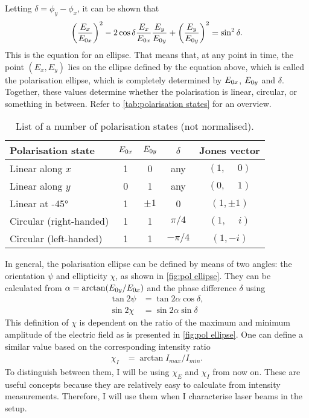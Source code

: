 Letting $ \delta = \phi_y-\phi_x $, it can be shown that 
\begin{equation}
	\left(\frac{E_x}{E_{0x}}\right)^2 - 2\cos\delta\frac{E_x}{E_{0x}}\frac{E_y}{E_{0y}} + \left(\frac{E_y}{E_{0y}}\right)^2 = \sin^2\delta.
\end{equation}
This is the equation for an ellipse. That means that, at any point in time, the point $ (E_x, E_y) $ lies on the ellipse defined by the equation above, which is called the polarisation ellipse, which is completely determined by $ E_{0x} $, $ E_{0y} $ and $ \delta $. Together, these values determine whether the polarisation is linear, circular, or something in between. Refer to \autoref{tab:polarisation states} for an overview.

\begin{table}
	\centering
	\begin{tabular}{lcccc}
		\toprule
		Polarisation state      & $ E_{0x} $ & $ E_{0y} $ & $ \delta $ &     Jones vector      \\ \midrule
		Linear along $ x $      &    1     &    0     &    any     & $ (1, \phantom{-}0) $ \\
		Linear along $ y $      &    0     &    1     &    any     & $ (0, \phantom{-}1) $ \\
		Linear at \ang{+-45}    &    1     & $ \pm1 $ &     0      &     $ (1, \pm1) $     \\
		Circular (right-handed) &    1     &    1     & $ \pi/4 $  & $ (1, \phantom{-}i) $ \\
		Circular (left-handed)  &    1     &    1     & $ -\pi/4 $ &      $ (1, -i) $      \\ \bottomrule
	\end{tabular}
	\caption{List of a number of polarisation states (not normalised).}
	\label{tab:polarisation states}
\end{table}


In general, the polarisation ellipse can be defined by means of two angles: the orientation $ \psi $ and ellipticity $ \chi $, as shown in \autoref{fig:pol ellipse}. They can be calculated from $ \alpha = \arctan(E_{0y}/E_{0x}) $ and the phase difference $ \delta $ using
\begin{align}
	\tan 2\psi &= \tan 2\alpha \cos \delta,\\
	\sin 2\chi &= \sin 2\alpha \sin \delta
\end{align}
This definition of $ \chi $ is dependent on the ratio of the maximum and minimum amplitude of the electric field as is presented in \autoref{fig:pol ellipse}. One can define a similar value based on the corresponding intensity ratio
\begin{align}
	\chi_I &= \arctan {I_\mathit{max}}/{I_\mathit{min}}.
\end{align}
To distinguish between them, I will be using $ \chi_E $ and $ \chi_I $ from now on. These are useful concepts because they are relatively easy to calculate from intensity measurements. Therefore, I will use them when I characterise laser beams in the setup.

